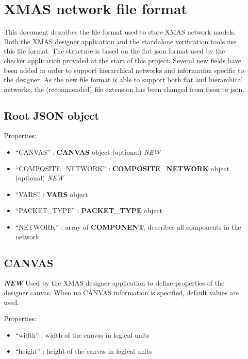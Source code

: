 \section{XMAS network file format}\label{xmas-network-file-format}

This document describes the file format used to store XMAS network
models. Both the XMAS designer application and the standalone
verification tools use this file format. The structure is based on the
flat json format used by the checker application provided at the start
of this project. Several new fields have been added in order to support
hierarchical networks and information specific to the designer. As the
new file format is able to support both flat and hierarchical networks,
the (recommended) file extension has been changed from fjson to json.

\subsection{Root JSON object}\label{root-json-object}

Properties:

\begin{itemize}
\itemsep1pt\parskip0pt
\item
  ``CANVAS'' : \textbf{CANVAS} object (optional) \emph{NEW}
\item
  ``COMPOSITE\_NETWORK'' : \textbf{COMPOSITE\_NETWORK} object (optional)
  \emph{NEW}
\item
  ``VARS'' : \textbf{VARS} object
\item
  ``PACKET\_TYPE'' : \textbf{PACKET\_TYPE} object
\item
  ``NETWORK'' : array of \textbf{COMPONENT}, describes all components in
  the network
\end{itemize}

\subsection{CANVAS}\label{canvas}

\textbf{\emph{NEW}} Used by the XMAS designer application to define
properties of the designer canvas. When no CANVAS information is
specified, default values are used.

Properties:

\begin{itemize}
\itemsep1pt\parskip0pt
\item
  ``width'' : width of the canvas in logical units
\item
  ``height'' : height of the canvas in logical units
\end{itemize}

